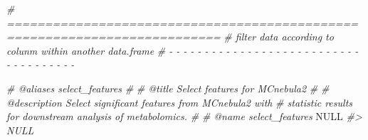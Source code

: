 \documentclass[
]{article}
\newenvironment{Shaded}{\begin{snugshade}}{\end{snugshade}}
\newcommand{\CommentTok}[1]{\textcolor[rgb]{0.56,0.35,0.01}{\textit{#1}}}
\newcommand{\ConstantTok}[1]{\textcolor[rgb]{0.00,0.00,0.00}{#1}}
\begin{document}
\begin{Shaded}
\begin{Highlighting}[]
\CommentTok{\# ==========================================================================}
\CommentTok{\# filter data according to colunm within another data.frame}
\CommentTok{\# {-} {-} {-} {-} {-} {-} {-} {-} {-} {-} {-} {-} {-} {-} {-} {-} {-} {-} {-} {-} {-} {-} {-} {-} {-} {-} {-} {-} {-} {-} {-} {-} {-} {-} {-} {-} {-}}

\CommentTok{\#\textquotesingle{} @aliases select\_features}
\CommentTok{\#\textquotesingle{}}
\CommentTok{\#\textquotesingle{} @title Select \textquotesingle{}features\textquotesingle{} for MCnebula2}
\CommentTok{\#\textquotesingle{}}
\CommentTok{\#\textquotesingle{} @description Select significant \textquotesingle{}features\textquotesingle{} from MCnebula2 with}
\CommentTok{\#\textquotesingle{} statistic results for downstream analysis of metabolomics.}
\CommentTok{\#\textquotesingle{}}
\CommentTok{\#\textquotesingle{} @name select\_features}
\ConstantTok{NULL}
\CommentTok{\#\textgreater{} NULL}


\end{Highlighting}
\end{Shaded}
\end{document}
